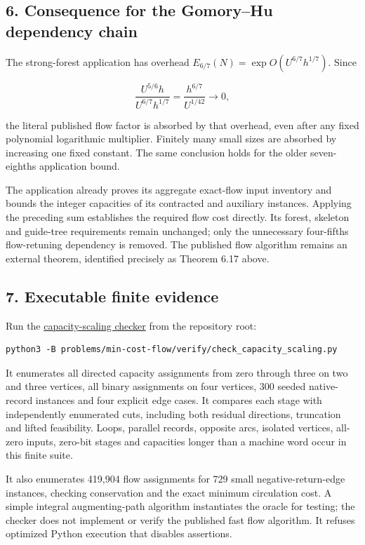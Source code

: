 \hypertarget{af-bcf24248b3-consequence-for-the-gomoryhu-dependency-chain}{%
\subsection{6. Consequence for the Gomory--Hu dependency chain}\label{af-bcf24248b3-consequence-for-the-gomoryhu-dependency-chain}}

The strong-forest application has overhead \(E_{6/7}(N)=\exp O(U^{6/7}h^{1/7})\). Since

\[
\frac{U^{5/6}h}{U^{6/7}h^{1/7}}
 =\frac{h^{6/7}}{U^{1/42}}\longrightarrow0,
\]

the literal published flow factor is absorbed by that overhead, even after any fixed polynomial logarithmic multiplier. Finitely many small sizes are absorbed by increasing one fixed constant. The same conclusion holds for the older seven-eighths application bound.

The application already proves its aggregate exact-flow input inventory and bounds the integer capacities of its contracted and auxiliary instances. Applying the preceding sum establishes the required flow cost directly. Its forest, skeleton and guide-tree requirements remain unchanged; only the unnecessary four-fifths flow-retuning dependency is removed. The published flow algorithm remains an external theorem, identified precisely as Theorem 6.17 above.

\hypertarget{af-bcf24248b3-executable-finite-evidence}{%
\subsection{7. Executable finite evidence}\label{af-bcf24248b3-executable-finite-evidence}}

Run the \href{https://github.com/icekylinx/algorithm-frontier/blob/main/problems/min-cost-flow/verify/check_capacity_scaling.py}{capacity-scaling checker} from the repository root:

\begin{verbatim}
python3 -B problems/min-cost-flow/verify/check_capacity_scaling.py
\end{verbatim}

It enumerates all directed capacity assignments from zero through three on two and three vertices, all binary assignments on four vertices, 300 seeded native-record instances and four explicit edge cases. It compares each stage with independently enumerated cuts, including both residual directions, truncation and lifted feasibility. Loops, parallel records, opposite arcs, isolated vertices, all-zero inputs, zero-bit stages and capacities longer than a machine word occur in this finite suite.

It also enumerates 419,904 flow assignments for 729 small negative-return-edge instances, checking conservation and the exact minimum circulation cost. A simple integral augmenting-path algorithm instantiates the oracle for testing; the checker does not implement or verify the published fast flow algorithm. It refuses optimized Python execution that disables assertions.
